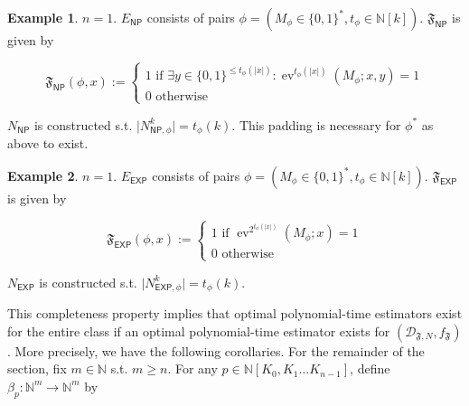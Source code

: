\documentclass{article}
\numberwithin{equation}{section}
\theoremstyle{definition}
\newtheorem{example}{Example}[section]
\theoremstyle{plain}
\newcommand{\Bool}{\{0,1\}}
\newcommand{\Words}{{\Bool^*}}
\DeclareMathOperator{\Ev}{ev}
\newcommand{\Nats}{\mathbb{N}}
\newcommand{\NatPoly}{\Nats[K_0, K_1 \ldots K_{n-1}]}
\newcommand{\Abs}[1]{\lvert #1 \rvert}
\newcommand{\Dist}{\mathcal{D}}
\begin{document}
\begin{samepage}
\begin{example}

${n = 1}$. ${E_{\mathsf{NP}}}$ consists of pairs ${\phi=(M_\phi \in \Words, t_\phi \in \Nats[k])}$. ${\mathfrak{F}_{\mathsf{NP}}}$ is given by 

\begin{equation}
\mathfrak{F}_{\mathsf{NP}}(\phi,x):=\begin{cases}1 \text{ if } \exists y\in \Bool^{\leq t_\phi(\Abs{x})}: \Ev^{ t_\phi(\Abs{x})}(M_\phi;x,y)=1 \\ 0 \text { otherwise} \end{cases}
\end{equation}

${N_{\mathsf{NP}}}$ is constructed s.t. ${\Abs{N_{\mathsf{NP},\phi}^k}=t_\phi(k)}$. This padding is necessary for ${\phi^*}$ as above to exist. 

\end{example}
\end{samepage}

\begin{samepage}
\begin{example}

${n = 1}$. ${E_{\mathsf{EXP}}}$ consists of pairs ${\phi=(M_\phi \in \Words, t_\phi \in \Nats[k])}$. ${\mathfrak{F}_{\mathsf{EXP}}}$ is given by 

\begin{equation}
\mathfrak{F}_{\mathsf{EXP}}(\phi,x):=\begin{cases}1 \text{ if } \Ev^{2^{t_\phi(\Abs{x})}}(M_\phi;x)=1 \\ 0 \text { otherwise} \end{cases}
\end{equation}

${N_{\mathsf{EXP}}}$ is constructed s.t. ${\Abs{N_{\mathsf{EXP},\phi}^k}=t_\phi(k)}$.

\end{example}
\end{samepage}

This completeness property implies that optimal polynomial-time estimators exist for the entire class if an optimal polynomial-time estimator exists for ${(\Dist_{\mathfrak{F},N},f_{\mathfrak{F}})}$. More precisely, we have the following corollaries. For the remainder of the section, fix ${m \in \Nats}$ s.t. ${m \geq n}$. For any ${p \in \NatPoly}$, define ${\beta_p: \Nats^m \rightarrow \Nats^m}$ by 
\end{document}

